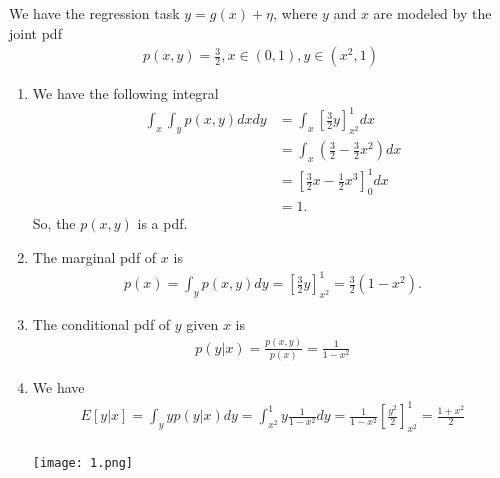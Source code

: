 \documentclass[12pt]{book}
\begin{document}
We have the regression task $y = g(x) + \eta$, where $y$ and $x$ are modeled by the joint pdf
\begin{align*}
	p(x,y) = \frac{3}{2}, x\in (0,1), y \in (x^2,1)
\end{align*}

\begin{enumerate}[label=(\alph*)]
	\item We have the following integral
	\begin{align*}
	\int_{x} \int_{y} p(x,y) dx dy &= \int_x \left[\frac{3}{2}y\right]^1_{x^2} dx \\ &= \int_x \left( \frac{3}{2} - \frac{3}{2}x^2 \right)dx \\ &= \left[\frac{3}{2}x - \frac{1}{2}x^3 \right]^1_0 dx \\ &= 1.
	\end{align*}
	So, the $p(x,y)$ is a pdf.
	\item The marginal pdf of $x$ is
	\begin{align*}
	p(x) = \int_y p(x,y) dy = \left[\frac{3}{2}y\right]^1_{x^2} = \frac{3}{2}(1-x^2).
	\end{align*}
	\item The conditional pdf of $y$ given $x$ is
	\begin{align*}
	p(y|x) = \frac{p(x,y)}{p(x)} = \frac{1}{1-x^2}
	\end{align*}
	\item We have
	\begin{align*}
	E[y|x] = \int_y yp(y|x)dy = \int_{x^2}^{1}y\frac{1}{1-x^2}dy = \frac{1}{1-x^2} \left[\frac{y^2}{2}\right]^1_{x^2} = \frac{1+x^2}{2}
	\end{align*}
	\\
	\centering \texttt{[image: 1.png]}
\end{enumerate}
\end{document}
